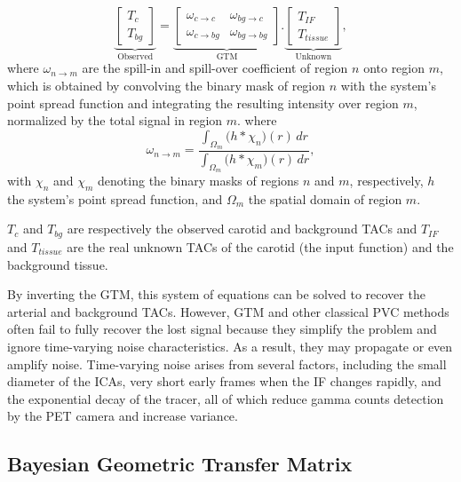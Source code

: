 \begin{equation}
	\underbrace{
		\begin{bmatrix}
			T_{c} \\
			T_{bg}
		\end{bmatrix}
	}_{\text{Observed}}
	=
	\underbrace{
		\begin{bmatrix}
			\omega_{c \rightarrow c}  & \omega_{bg \rightarrow c}  \\
			\omega_{c \rightarrow bg} & \omega_{bg \rightarrow bg}
		\end{bmatrix}
	}_{\text{GTM}}
	.
	\underbrace{
		\begin{bmatrix}
			T_{IF} \\
			T_{tissue}
		\end{bmatrix}
	}_{\text{Unknown}},
\end{equation}
where $\omega_{n \rightarrow m}$ are the spill-in and spill-over coefficient of region $n$ onto region $m$, which is obtained by convolving the binary mask of region $n$ with the system's point spread function and integrating the resulting intensity over region $m$, normalized by the total signal in region $m$.
where
\begin{equation}
	\omega_{n\to m} = \frac{\displaystyle \int_{\Omega_m} \bigl( h \ast \chi_n \bigr)(r)\,dr}{\displaystyle \int_{\Omega_m} \bigl( h \ast \chi_m \bigr)(r)\,dr},
\end{equation}
with \(\chi_n\) and \(\chi_m\) denoting the binary masks of regions \(n\) and \(m\), respectively, \(h\) the system's point spread function, and \(\Omega_m\) the spatial domain of region \(m\).

$T_{c}$ and $T_{bg}$ are respectively the observed carotid and background TACs and $T_{IF}$ and $T_{tissue}$ are the real unknown TACs of the carotid (the input function) and the background tissue.

By inverting the GTM, this system of equations can be solved to recover the arterial and background TACs.
However, GTM and other classical PVC methods often fail to fully recover the lost signal because they simplify the problem and ignore time-varying noise characteristics.
As a result, they may propagate or even amplify noise.
Time-varying noise arises from several factors, including the small diameter of the ICAs, very short early frames when the IF changes rapidly, and the exponential decay of the tracer, all of which reduce gamma counts detection by the PET camera and increase variance.

\subsection{Bayesian Geometric Transfer Matrix}

